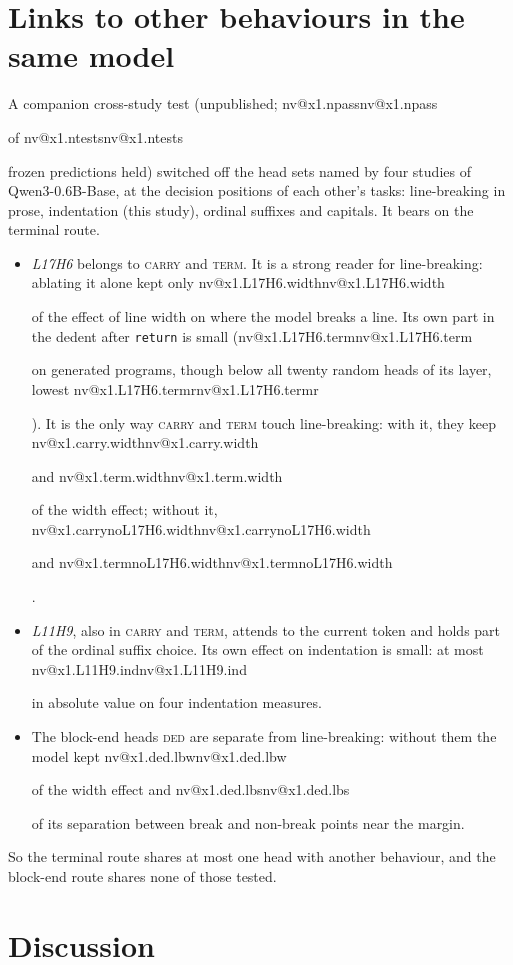 \documentclass[11pt]{article}
\makeatletter
\newcommand{\nv}[1]{\ifcsname nv@#1\endcsname\csname nv@#1\endcsname\else\PackageError{numbers}{Unknown number key #1}{}\fi}
\newcommand{\qw}{Qwen3-0.6B-Base}
\newcommand{\hd}[2]{L#1H#2}
\newcommand{\ded}{\textsc{ded}}
\newcommand{\term}{\textsc{term}}
\newcommand{\carry}{\textsc{carry}}
\newcommand{\code}[1]{\texttt{#1}}
\makeatother
\begin{document}
\section{Links to other behaviours in the same model}
\label{sec:x1}

A companion cross-study test (unpublished; \nv{x1.npass} of \nv{x1.ntests} frozen predictions held) switched off the head sets named by four studies of \qw{}, at the decision positions of each other's tasks: line-breaking in prose, indentation (this study), ordinal suffixes and capitals. It bears on the terminal route.
\begin{itemize}
\item \emph{\hd{17}{6}} belongs to \carry{} and \term{}. It is a strong reader for line-breaking: ablating it alone kept only \nv{x1.L17H6.width} of the effect of line width on where the model breaks a line. Its own part in the dedent after \code{return} is small (\nv{x1.L17H6.term} on generated programs, though below all twenty random heads of its layer, lowest \nv{x1.L17H6.termr}). It is the only way \carry{} and \term{} touch line-breaking: with it, they keep \nv{x1.carry.width} and \nv{x1.term.width} of the width effect; without it, \nv{x1.carrynoL17H6.width} and \nv{x1.termnoL17H6.width}.
\item \emph{\hd{11}{9}}, also in \carry{} and \term{}, attends to the current token and holds part of the ordinal suffix choice. Its own effect on indentation is small: at most \nv{x1.L11H9.ind} in absolute value on four indentation measures.
\item The block-end heads \ded{} are separate from line-breaking: without them the model kept \nv{x1.ded.lbw} of the width effect and \nv{x1.ded.lbs} of its separation between break and non-break points near the margin.
\end{itemize}
So the terminal route shares at most one head with another behaviour, and the block-end route shares none of those tested.

\section{Discussion}
\label{sec:discussion}
\end{document}
